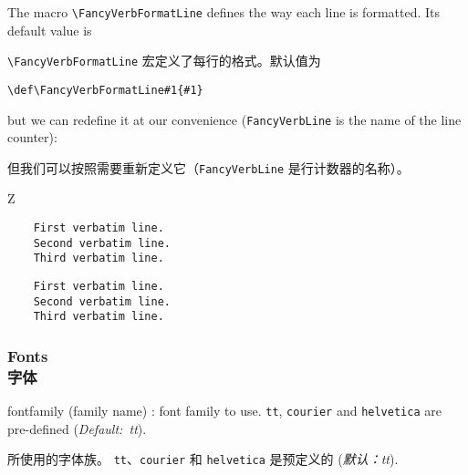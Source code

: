 \documentclass[twoside]{article}
\newcommand\cs[1]{\texttt{\textbackslash#1}}
\providecommand\optname[1]{\textsf{#1}}
\newenvironment{optlist}{\begin{description}%
  \renewcommand\makelabel[1]{%
    \descriptionlabel{\mdseries\optname{##1}}}%
  \itemsep0.25\itemsep}%
 {\end{description}}
\begin{document}

The macro \cs{FancyVerbFormatLine} defines the way each line is formatted.
Its default value is

\cs{FancyVerbFormatLine} 宏定义了每行的格式。默认值为

\verb+\def\FancyVerbFormatLine#1{#1}+

but we can
redefine it at our convenience (\texttt{FancyVerbLine} is the name of the
line counter):

但我们可以按照需要重新定义它（\texttt{FancyVerbLine} 是行计数器的名称）。


{
\begin{SideBySideExample}
  Z
  \renewcommand{\FancyVerbFormatLine}[1]{%
    \makebox[0cm][l]{$\Rightarrow$}#1}
  \begin{Verbatim}
    First verbatim line.
    Second verbatim line.
    Third verbatim line.
  \end{Verbatim}
\end{SideBySideExample}

\begin{SideBySideExample}
  \renewcommand{\FancyVerbFormatLine}[1]{%
    \ifodd\value{FancyVerbLine}%
      \MakeUppercase{#1}\else#1\fi}
  \begin{Verbatim}
    First verbatim line.
    Second verbatim line.
    Third verbatim line.
  \end{Verbatim}
\end{SideBySideExample}
}

\subsubsection{Fonts\\字体}

\begin{optlist}
  \item[fontfamily (family name)]: font family to use.
  \texttt{tt}, \texttt{courier} and \texttt{helvetica} are pre-defined
  (\emph{Default:~tt}).

所使用的字体族。%
\texttt{tt}、\texttt{courier} 和 \texttt{helvetica} 是预定义的
(\emph{默认：tt}).
\end{optlist}
\end{document}
